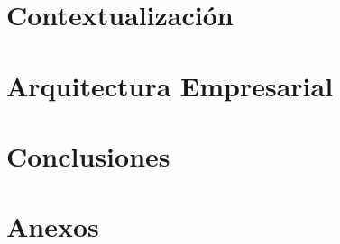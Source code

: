 \documentclass[paper=A4,twoside=true,openright,parskip=full,chapterprefix=true,11pt,headings=normal,bibliography=totoc,listof=totoc,titlepage=on,captions=tableabove,draft=false
]{scrreprt}
\begin{document}
	\pagestyle{empty}
	
	\cleardoublepage
	\pagestyle{plain}
	
	\cleardoublepage
	
	\cleardoublepage
	

	\cleardoublepage
	\dominitoc
	\setcounter{tocdepth}{2}
	\tableofcontents
	\cleardoublepage
	\listoffigures
	\cleardoublepage
	\listoftables
	\cleardoublepage
	\setcounter{page}{1}
	\pagestyle{maincontentstyle}
	\cleardoublepage
	
	\part{Contextualización}
		
		
	\part{Arquitectura Empresarial}
		
		
		
		
		
	\part{Conclusiones}
		\cleardoublepage
		
		\cleardoublepage
		
		\cleardoublepage
		
	\part{Anexos}
		\cleardoublepage
		\appendix
		
	\printindex
\end{document}
